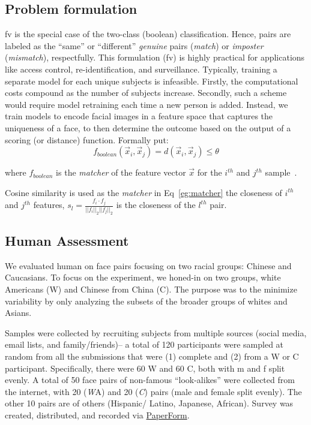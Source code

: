 \subsection{Problem formulation}\label{subsec:pf} 
\Gls{fv} is the special case of the two-class (\ie boolean) classification. Hence, pairs are labeled as the ``same'' or ``different'' \textit{genuine} pairs (\ie \textit{match}) or \textit{imposter} (\ie \textit{mismatch}), respectfully. This formulation (\ie \gls{fv}) is highly practical for applications like access control, re-identification, and surveillance. Typically, training a separate model for each unique subjects is infeasible. Firstly, the computational costs compound as the number of subjects increase.  Secondly, such a scheme would require model retraining each time a new person is added. Instead, we train models to encode facial images in a feature space that captures the uniqueness of a face, to then determine the outcome based on the output of a scoring (or distance) function. Formally put:
\begin{equation}\label{eg:matcher}
    f_{boolean}(\vec{x}_i, \vec{x}_j) = d(\vec{x}_i, \vec{x}_j) \leq \theta
\end{equation}

where $f_{boolean}$ is the \textit{matcher} of the feature vector $\vec{x}$ for the $i^{th}$ and $j^{th}$ sample~\cite{LFWTech}.

Cosine similarity is used as the \emph{matcher} in Eq~\ref{eg:matcher} the closeness of $i^{th}$ and $j^{th}$ features, \ie
$
s_l= \frac{f_i\cdot f_j}{||f_i||_2||f_j||_2}
$ is the closeness of the $l^{th}$ pair. 


\subsection{Human Assessment}\label{subsec:human-assessment}
We evaluated human on face pairs focusing on two racial groups: Chinese and Caucasians. To focus on the experiment, we honed-in on two groups, white Americans (W) and Chinese from China (C). The purpose was to the minimize variability by only analyzing the subsets of the broader groups of whites and Asians. 

Samples were collected by recruiting subjects from multiple sources (\eg social media, email lists, and family/friends)-- a total of 120 participants were sampled at random from all the submissions that were (1) complete and (2) from a W or C participant. Specifically, there were 60 W and 60 C, both with \gls{m} and \gls{f} split evenly. A total of 50 face pairs of non-famous ``look-alikes'' were collected from the internet, with 20 ({\emph WA}) and 20 ({\emph C}) pairs (male and female split evenly). The other 10 pairs are of others (\eg Hispanic/ Latino, Japanese, African). Survey was created, distributed, and recorded via \href{https://paperform.co}{PaperForm}. 